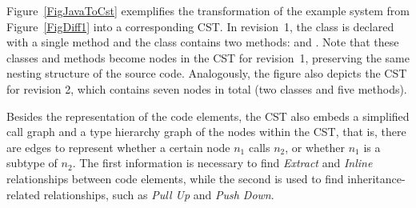Figure~\ref{FigJavaToCst} exemplifies the transformation of the example system from Figure~\ref{FigDiff1} into a corresponding CST.
In revision~1, the class  is declared with a single method  and the class  contains two methods:  and .
Note that these classes and methods become nodes in the CST for revision~1, preserving the same nesting structure of the source code. Analogously, the figure also depicts the CST for revision 2, which contains seven nodes in total (two classes and five methods).

Besides the representation of the code elements, the CST also embeds a simplified call graph and  a type hierarchy graph of the nodes within the CST, that is, there are edges to represent whether a certain node $n_1$ calls $n_2$, or whether $n_1$ is a subtype of $n_2$. The first information is necessary to find \emph{Extract} and \emph{Inline} relationships between code elements, while the second is used to find inheritance-related relationships, such as \emph{Pull Up} and \emph{Push Down}.

